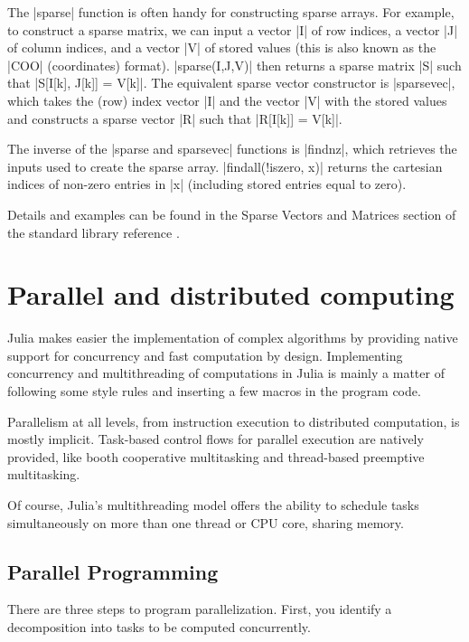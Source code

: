 The |sparse| function is often handy for constructing sparse arrays. For example, to construct a sparse matrix, we can input a vector |I| of row indices, a vector |J| of column indices, and a vector |V| of stored values (this is also known as the |COO| (coordinates) format). |sparse(I,J,V)| then returns a sparse matrix |S| such that |S[I[k], J[k]] = V[k]|. The equivalent sparse vector constructor is |sparsevec|, which takes the (row) index vector |I| and the vector |V| with the stored values and constructs a sparse vector |R| such that |R[I[k]] = V[k]|.

The inverse of the |sparse and sparsevec| functions is |findnz|, which retrieves the inputs used to create the sparse array. |findall(!iszero, x)| returns the cartesian indices of non-zero entries in |x| (including stored entries equal to zero).

Details and examples can be found in the Sparse Vectors and Matrices section of the standard library reference \cite{julia:SparseArrays}.



\section{Parallel and distributed computing}\label{sect:1-5}


Julia makes easier the implementation of complex algorithms by providing native support for concurrency and fast computation by design. Implementing concurrency and multithreading of computations in Julia is mainly a matter of following some style rules and inserting a few macros in the program code.

Parallelism at all levels, from instruction execution to distributed computation, is mostly implicit.
Task-based control flows for parallel execution are natively provided, like booth cooperative multitasking and thread-based preemptive multitasking. 

Of course, Julia's multithreading model offers the ability to schedule tasks simultaneously on more than one thread or CPU core, sharing memory.

\subsection{Parallel Programming}
\label{subsec:2:style}

There are three steps to program parallelization. First, you identify a decomposition into tasks to be computed concurrently.


